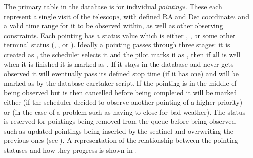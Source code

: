 \begin{colsection}
\begin{colsection}
The primary table in the database is for individual \textit{pointings}. These each represent a single visit of the telescope, with defined RA and Dec coordinates and a valid time range for it to be observed within, as well as other observing constraints. Each pointing has a status value which is either , ,  or some other terminal status (, ,  or ). Ideally a pointing passes through three stages: it is created as , the scheduler selects it and the pilot marks it as , then if all is well when it is finished it is marked as . If it stays in the database and never gets observed it will eventually pass its defined stop time (if it has one) and will be marked as  by the database caretaker script. If the pointing is in the middle of being observed but is then cancelled before being completed it will be marked either  (if the scheduler decided to observe another pointing of a higher priority) or  (in the case of a problem such as having to close for bad weather). The  status is reserved for pointings being removed from the queue before being observed, such as updated pointings being inserted by the sentinel and overwriting the previous ones (see ). A representation of the relationship between the pointing statuses and how they progress is shown in .


\end{colsection}
\end{colsection}
